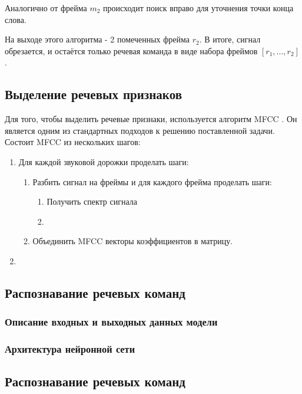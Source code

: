 Аналогично от фрейма $m_2$ происходит поиск вправо для уточнения точки конца слова.

На выходе этого алгоритма - 2 помеченных фрейма $r_2$. В итоге, сигнал обрезается, и остаётся только речевая команда в виде набора фреймов $[r_1, ... , r_2]$.  

\subsection{Выделение речевых признаков}
Для того, чтобы выделить речевые признаки, используется алгоритм MFCC \cite{MFCC}. Он является одним из стандартных подходов к решению поставленной задачи. Состоит MFCC из нескольких шагов:
\begin{enumerate}
	\item Для каждой звуковой дорожки проделать шаги:
	\begin{enumerate}
		\item Разбить сигнал на фреймы и для каждого фрейма проделать шаги:
		\begin{enumerate}
			\item Получить спектр сигнала
			\item  
		\end{enumerate}
		\item Объединить MFCC векторы коэффициентов в матрицу.
	\end{enumerate}

	\item 
\end{enumerate}
  
\subsubsection{}

\subsection{Распознавание речевых команд}
\subsubsection{Описание входных и выходных данных модели}
\subsubsection{Архитектура нейронной сети}
\subsubsection{}


\subsection{Распознавание речевых команд}